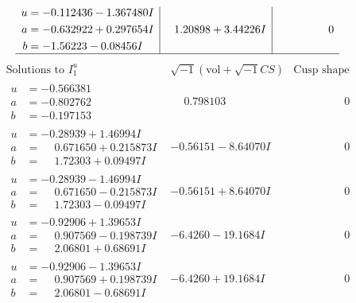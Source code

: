 \documentclass[1p]{elsarticle_modified}
\theoremstyle{definition}
\newcommand{\I}{\sqrt{-1}}
\begin{document}
$$\begin{array}{c|c|c}
\begin{aligned}
u &= -0.112436 - 1.367480 I \\
a &= -0.632922 + 0.297654 I \\
b &= -1.56223 - 0.08456 I\end{aligned}
 & \phantom{-}1.20898 + 3.44226 I & \phantom{-0.000000 } 0\\
 \hline 
 \end{array}$$\newpage$$\begin{array}{c|c|c}  
\text{Solutions to }I^u_{1}& \I (\text{vol} + \sqrt{-1}CS) & \text{Cusp shape}\\
 \hline 
\begin{aligned}
u &= -0.566381\phantom{ +0.000000I} \\
a &= -0.802762\phantom{ +0.000000I} \\
b &= -0.197153\phantom{ +0.000000I}\end{aligned}
 & \phantom{-}0.798103\phantom{ +0.000000I} & \phantom{-0.000000 } 0 \\ \hline\begin{aligned}
u &= -0.28939 + 1.46994 I \\
a &= \phantom{-}0.671650 + 0.215873 I \\
b &= \phantom{-}1.72303 + 0.09497 I\end{aligned}
 & -0.56151 - 8.64070 I & \phantom{-0.000000 } 0 \\ \hline\begin{aligned}
u &= -0.28939 - 1.46994 I \\
a &= \phantom{-}0.671650 - 0.215873 I \\
b &= \phantom{-}1.72303 - 0.09497 I\end{aligned}
 & -0.56151 + 8.64070 I & \phantom{-0.000000 } 0 \\ \hline\begin{aligned}
u &= -0.92906 + 1.39653 I \\
a &= \phantom{-}0.907569 - 0.198739 I \\
b &= \phantom{-}2.06801 + 0.68691 I\end{aligned}
 & -6.4260 - 19.1684 I & \phantom{-0.000000 } 0 \\ \hline\begin{aligned}
u &= -0.92906 - 1.39653 I \\
a &= \phantom{-}0.907569 + 0.198739 I \\
b &= \phantom{-}2.06801 - 0.68691 I\end{aligned}
 & -6.4260 + 19.1684 I & \phantom{-0.000000 } 0 \\ \hline\begin{aligned}

\end{aligned}
\end{array}$$
\end{document}
